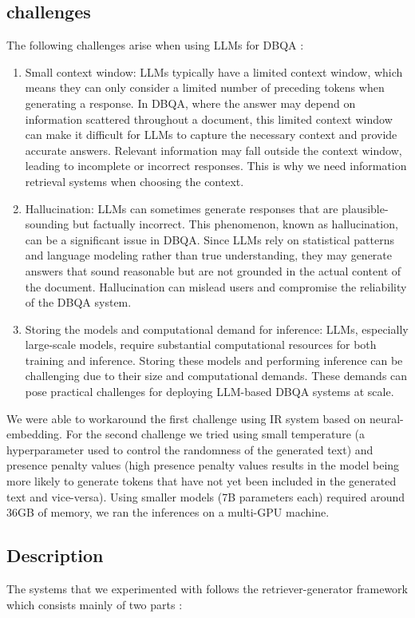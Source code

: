 \documentclass[a4paper,12pt]{article}
\begin{document}
\subsection{challenges}
The following challenges arise when using LLMs for DBQA : 
\begin{enumerate}
	\item Small context window: LLMs typically have a limited context window, which means they can only consider a limited number of preceding tokens when generating a response. In DBQA, where the answer may depend on information scattered throughout a document, this limited context window can make it difficult for LLMs to capture the necessary context and provide accurate answers. Relevant information may fall outside the context window, leading to incomplete or incorrect responses. 
    This is why we need information retrieval systems when choosing the context.
	\item Hallucination: LLMs can sometimes generate responses that are plausible-sounding but factually incorrect. 
    This phenomenon, known as hallucination, can be a significant issue in DBQA. Since LLMs rely on statistical patterns and language modeling rather than true understanding, they may generate answers that sound reasonable but are not grounded in the actual content of the document. Hallucination can mislead users and compromise the reliability of the DBQA system.
	\item Storing the models and computational demand for inference: LLMs, especially large-scale models, require substantial computational resources for both training and inference. Storing these models and performing inference can be challenging due to their size and computational demands. These demands can pose practical challenges for deploying LLM-based DBQA systems at scale.
\end{enumerate}

We were able to workaround the first challenge using IR system based on neural-embedding. 
For the second challenge we tried using small temperature (a hyperparameter used to control the randomness of the generated text) and presence penalty values (high presence penalty values results in the model being more likely to 
generate tokens that have not yet been included in the generated text and vice-versa).
Using smaller models (7B parameters each) required around 36GB of memory, we ran the inferences on a multi-GPU machine.

\subsection{Description}
The systems that we experimented with follows the retriever-generator framework which consists mainly of two parts : 
\end{document}
